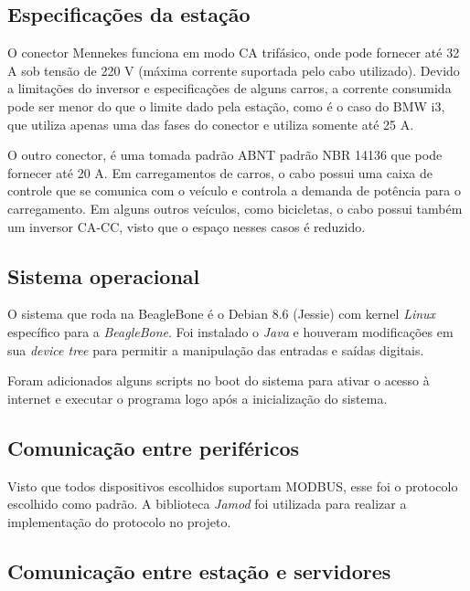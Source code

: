     \subsection{Especificações da estação}
    \label{methodology:structure:specs}

      O conector Mennekes funciona em modo \ac{CA} trifásico, onde pode fornecer até 32 A sob tensão de 220 V (máxima corrente suportada pelo cabo utilizado). Devido a limitações do inversor e especificações de alguns carros, a corrente consumida pode ser menor do que o limite dado pela estação, como é o caso do BMW i3, que utiliza apenas uma das fases do conector e utiliza somente até 25 A. 

      O outro conector, é uma tomada padrão ABNT padrão NBR 14136 \cite{nbr-14136} que pode fornecer até 20 A. Em carregamentos de carros, o cabo possui uma caixa de controle que se comunica com o veículo e controla a demanda de potência para o carregamento. Em alguns outros veículos, como bicicletas, o cabo possui também um inversor \ac{CA}-\ac{CC}, visto que o espaço nesses casos é reduzido.

    \subsection{Sistema operacional}
    \label{methodology:structure:os}

      O sistema que roda na BeagleBone é o Debian 8.6 (Jessie) com kernel \textit{Linux} específico para a \textit{BeagleBone}. Foi instalado o \textit{Java} e houveram modificações em sua \textit{device tree} para permitir a manipulação das entradas e saídas digitais.

      Foram adicionados alguns scripts no boot do sistema para ativar o acesso à internet e executar o programa logo após a inicialização do sistema.

    \subsection{Comunicação entre periféricos}
    \label{methodology:structure:com}

      Visto que todos dispositivos escolhidos suportam MODBUS, esse foi o protocolo escolhido como padrão. A biblioteca \textit{Jamod} foi utilizada para realizar a implementação do protocolo no projeto.

    \subsection{Comunicação entre estação e servidores}
    \label{methodology:structure:ocpp}


